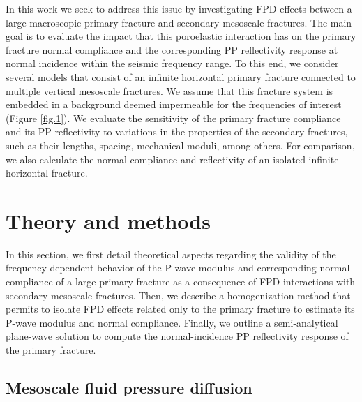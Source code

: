 \documentclass[draft]{agujournal2019}
\begin{document}
In this work we seek to address this issue by investigating  FPD effects between a large macroscopic primary fracture and secondary mesoscale fractures. The main goal is to evaluate the impact that this poroelastic interaction has on the primary fracture normal compliance and the corresponding PP reflectivity response at normal incidence within the seismic frequency range. To this end, we consider several models that consist of an infinite horizontal primary fracture connected to multiple vertical mesoscale fractures. We assume that this fracture system is embedded in a background deemed impermeable for the frequencies of interest (Figure \ref{fig.1}). We evaluate the sensitivity of the primary fracture compliance and its PP reflectivity to variations in the properties of the secondary fractures, such as  their lengths, spacing, mechanical moduli, among others. 
For comparison, we also calculate the normal compliance and reflectivity of an isolated infinite horizontal fracture. 

\section{Theory and methods}
In this section, we first detail theoretical aspects regarding the validity of the frequency-dependent behavior of the P-wave modulus and corresponding normal compliance of a large primary fracture as a  consequence of FPD interactions with secondary mesoscale fractures. Then, we describe a homogenization method that permits to isolate FPD effects related only to the primary fracture to estimate its P-wave modulus and normal compliance. Finally, we outline a semi-analytical plane-wave solution to compute the normal-incidence PP reflectivity response of the primary fracture.

\subsection{Mesoscale fluid pressure diffusion}
\end{document}
